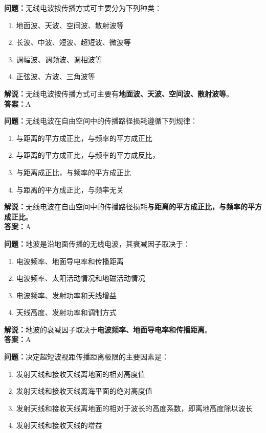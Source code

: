 \textbf{问题：}无线电波按传播方式可主要分为下列种类：

\begin{enumerate}[label=\Alph*), leftmargin=1cm]
	\item 地面波、天波、空间波、散射波等
	\item 长波、中波、短波、超短波、微波等
	\item 调幅波、调频波、调相波等
	\item 正弦波、方波、三角波等
\end{enumerate}

\textbf{解说：}无线电波按传播方式可主要有\textbf{地面波、天波、空间波、散射波等}。\\\textbf{答案：}A%



\textbf{问题：}无线电波在自由空间中的传播路径损耗遵循下列规律：

\begin{enumerate}[label=\Alph*), leftmargin=1cm]
	\item 与距离的平方成正比，与频率的平方成正比
	\item 与距离的平方成正比，与频率的平方成反比，
	\item 与距离成正比，与频率的平方成正比
	\item 与距离的平方成正比，与频率无关
\end{enumerate}

\textbf{解说：}无线电波在自由空间中的传播路径损耗\textbf{与距离的平方成正比，与频率的平方成正比}。\\\textbf{答案：}A%



\textbf{问题：}地波是沿地面传播的无线电波，其衰减因子取决于：

\begin{enumerate}[label=\Alph*), leftmargin=1cm]
	\item 电波频率、地面导电率和传播距离
	\item 电波频率、太阳活动情况和地磁活动情况
	\item 电波频率、发射功率和天线增益
	\item 天线高度、发射功率和调制方式
\end{enumerate}

\textbf{解说：}地波的衰减因子取决于\textbf{电波频率、地面导电率和传播距离}。\\\textbf{答案：}A%



\textbf{问题：}决定超短波视距传播距离极限的主要因素是：

\begin{enumerate}[label=\Alph*), leftmargin=1cm]
	\item 发射天线和接收天线离地面的相对高度值
	\item 发射天线和接收天线离海平面的绝对高度值
	\item 发射天线和接收天线离地面的相对于波长的高度系数，即离地高度除以波长
	\item 发射天线和接收天线的增益
\end{enumerate}

